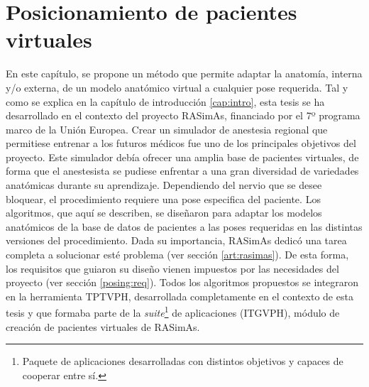 \chapter{Posicionamiento de pacientes virtuales} 
\label{cap:posing}

En este capítulo, se propone un método que permite adaptar la anatomía, interna y/o externa, de un modelo anatómico virtual a cualquier pose requerida. Tal y como se explica en la capítulo de introducción \ref{cap:intro}, esta tesis se ha desarrollado en el contexto del proyecto \ac{RASimAs}, financiado por el 7º programa marco de la Unión Europea. Crear un simulador de anestesia regional que permitiese entrenar a los futuros médicos fue uno de los principales objetivos del proyecto. 
Este simulador debía ofrecer una amplia base de pacientes virtuales, de forma que el anestesista se pudiese enfrentar a una gran diversidad de variedades anatómicas durante su aprendizaje. Dependiendo del nervio que se desee bloquear, el procedimiento requiere una pose especifica del paciente. Los algoritmos, que aquí se describen, se diseñaron para adaptar los modelos anatómicos de la base de datos de pacientes a las poses requeridas en las distintas versiones del procedimiento. Dada su importancia, \ac{RASimAs} dedicó una tarea completa a solucionar esté problema (ver sección \ref{art:rasimas}). 
De esta forma, los requisitos que guiaron su diseño vienen impuestos por las necesidades del proyecto (ver sección \ref{posing:req}). Todos los algoritmos propuestos se integraron en la herramienta \ac{TPTVPH}, desarrollada completamente en el contexto de esta tesis y que formaba parte de la \emph{suite}\footnote{Paquete de aplicaciones desarrolladas con distintos objetivos y capaces de cooperar entre sí.} de aplicaciones (\ac{ITGVPH}), módulo de creación de pacientes virtuales de  \ac{RASimAs}.



